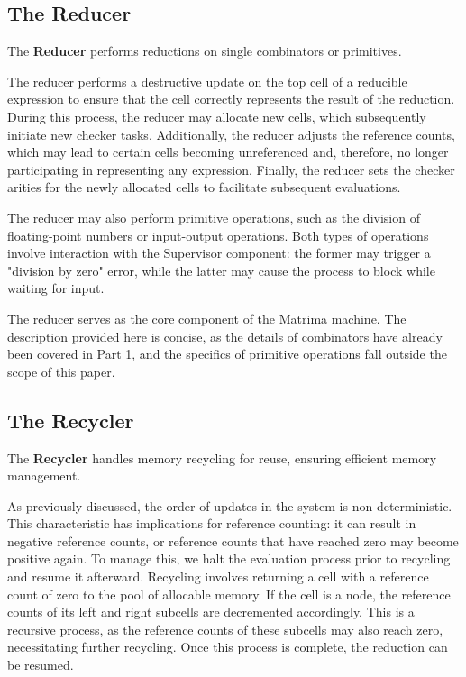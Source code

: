 \documentclass{IEEEtran}
\begin{document}
\subsection{The Reducer}
The \textbf{Reducer} performs reductions on single combinators or primitives.

\par The reducer performs a destructive update on the top cell of a reducible expression to ensure that the cell correctly represents the result of the reduction. During this process, the reducer may allocate new cells, which subsequently initiate new checker tasks. Additionally, the reducer adjusts the reference counts, which may lead to certain cells becoming unreferenced and, therefore, no longer participating in representing any expression. Finally, the reducer sets the checker arities for the newly allocated cells to facilitate subsequent evaluations.

\par The reducer may also perform primitive operations, such as the division of floating-point numbers or input-output operations. Both types of operations involve interaction with the Supervisor component: the former may trigger a "division by zero" error, while the latter may cause the process to block while waiting for input.

\par The reducer serves as the core component of the Matrima machine. The description provided here is concise, as the details of combinators have already been covered in Part 1, and the specifics of primitive operations fall outside the scope of this paper.

\subsection{The Recycler}
The \textbf{Recycler} handles memory recycling for reuse, ensuring efficient memory management.

\par As previously discussed, the order of updates in the system is non-deterministic. This characteristic has implications for reference counting: it can result in negative reference counts, or reference counts that have reached zero may become positive again. To manage this, we halt the evaluation process prior to recycling and resume it afterward. Recycling involves returning a cell with a reference count of zero to the pool of allocable memory. If the cell is a node, the reference counts of its left and right subcells are decremented accordingly. This is a recursive process, as the reference counts of these subcells may also reach zero, necessitating further recycling. Once this process is complete, the reduction can be resumed.
\end{document}

